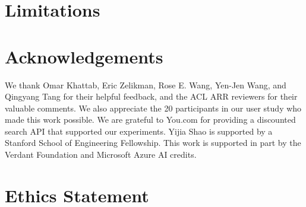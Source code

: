 \documentclass[11pt]{article}
\begin{document}
\section*{Limitations}


\section*{Acknowledgements}
We thank Omar Khattab, Eric Zelikman, Rose E. Wang, Yen-Jen Wang, and Qingyang Tang for their helpful feedback, and the ACL ARR reviewers for their valuable comments. We also appreciate the 20 participants in our user study who made this work possible. We are grateful to You.com for providing a discounted search API that supported our experiments. Yijia Shao is supported by a Stanford School of Engineering Fellowship. This work is supported in part by the Verdant Foundation and Microsoft Azure AI credits. 

\section*{Ethics Statement}




%

\clearpage
\appendix

\end{document}
